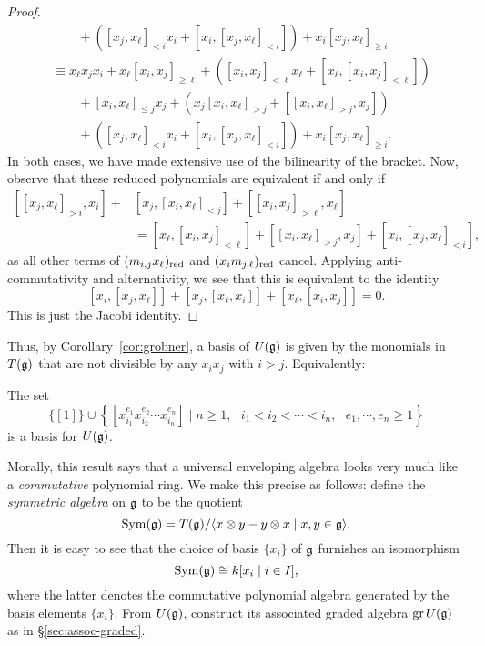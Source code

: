 \begin{proof}
\begin{align*}
&\qquad+([x_j,x_\ell]_{<i}x_i+[x_i,[x_j,x_\ell]_{<i}])+x_i[x_j,x_\ell]_{\ge i}\\
&\equiv x_\ell x_jx_i+x_\ell[x_i,x_j]_{\ge \ell}+([x_i,x_j]_{<\ell}x_\ell+[x_\ell,[x_i,x_j]_{<\ell}])\\
&\qquad+[x_i,x_\ell]_{\le j}x_j+(x_j[x_i,x_\ell]_{>j}+[[x_i,x_\ell]_{>j},x_j])\\
&\qquad+([x_j,x_\ell]_{<i}x_i+[x_i,[x_j,x_\ell]_{<i}])+x_i[x_j,x_\ell]_{\ge i}.
\end{align*}
In both cases, we have made extensive use of the bilinearity of the bracket. Now, observe that these reduced polynomials are equivalent if and only if
\begin{equation}
\label{eqn:ueaconsistency}
\begin{split}
[[x_j,x_\ell]_{>i},x_i]+&[x_j,[x_i,x_\ell]_{<j}]+[[x_i,x_j]_{>\ell},x_\ell]\\
&=[x_\ell,[x_i,x_j]_{<\ell}]+[[x_i,x_\ell]_{>j},x_j]+[x_i,[x_j,x_\ell]_{<i}],
\end{split}
\end{equation}
as all other terms of $(m_{i,j}x_\ell)_{\mathrm{red}}$ and $(x_im_{j,\ell})_{\mathrm{red}}$ cancel. Applying anti-commutativity and alternativity, we see that this is equivalent to the identity
\begin{equation}
\label{eqn:jacobi}
[x_i,[x_j,x_\ell]]+[x_j,[x_\ell,x_i]]+[x_\ell,[x_i,x_j]]=0.
\end{equation}
This is just the Jacobi identity.
\end{proof}

Thus, by Corollary~\ref{cor:grobner}, a basis of $U(\mathfrak{g})$ is given by the monomials in $T(\mathfrak{g})$ that are not divisible by any $x_ix_j$ with $i>j$. Equivalently:
\begin{thm}
\label{thm:ugbasis}
The set
\begin{equation}
\label{eqn:ugbasis}
\{[1]\}\cup\left\{[x_{i_1}^{e_1}x_{i_2}^{e_2}\cdots x_{i_n}^{e_n}]\mid n\ge 1,\text{ }i_1<i_2<\cdots<i_n,\text{ }e_1,\cdots,e_n\ge 1\right\}
\end{equation}
is a basis for $U(\mathfrak{g})$.
\end{thm}
Morally, this result says that a universal enveloping algebra looks very much like a \emph{commutative} polynomial ring. We make this precise as follows: define the \emph{symmetric algebra} on $\mathfrak{g}$ to be the quotient
\begin{equation*}
\operatorname{Sym}(\mathfrak{g})=T(\mathfrak{g})/\langle x\otimes y-y\otimes x\mid x,y\in\mathfrak{g}\rangle.
\end{equation*}
Then it is easy to see that the choice of basis $\{x_i\}$ of $\mathfrak{g}$ furnishes an isomorphism
\begin{equation}
\label{eqn:symisopoly}
\operatorname{Sym}(\mathfrak{g})\cong k[x_i\mid i\in I],
\end{equation}
where the latter denotes the commutative polynomial algebra generated by the basis elements $\{x_i\}$. From $U(\mathfrak{g})$, construct its associated graded algebra $\operatorname{gr} U(\mathfrak{g})$ as in \S\ref{sec:assoc-graded}.


